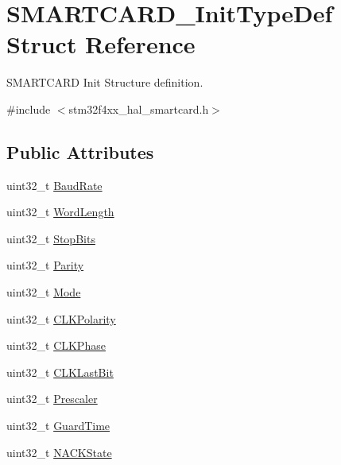 \hypertarget{struct_s_m_a_r_t_c_a_r_d___init_type_def}{}\section{S\+M\+A\+R\+T\+C\+A\+R\+D\+\_\+\+Init\+Type\+Def Struct Reference}
\label{struct_s_m_a_r_t_c_a_r_d___init_type_def}


S\+M\+A\+R\+T\+C\+A\+RD Init Structure definition.  




{\ttfamily \#include $<$stm32f4xx\+\_\+hal\+\_\+smartcard.\+h$>$}

\subsection*{Public Attributes}
\begin{DoxyCompactItemize}
\item 
uint32\+\_\+t \hyperlink{struct_s_m_a_r_t_c_a_r_d___init_type_def_ab7fd32cfbfc629344b4e4d5844e798cd}{Baud\+Rate}
\item 
uint32\+\_\+t \hyperlink{struct_s_m_a_r_t_c_a_r_d___init_type_def_a16a8ba82fbc742510824bb0d8e85fbbc}{Word\+Length}
\item 
uint32\+\_\+t \hyperlink{struct_s_m_a_r_t_c_a_r_d___init_type_def_ac0eb966bac71de17ace31fa5214c23f9}{Stop\+Bits}
\item 
uint32\+\_\+t \hyperlink{struct_s_m_a_r_t_c_a_r_d___init_type_def_aaefc9fdd7fd84b066ded393a3830743f}{Parity}
\item 
uint32\+\_\+t \hyperlink{struct_s_m_a_r_t_c_a_r_d___init_type_def_acf1faf22e7003550470b97b9f77425f9}{Mode}
\item 
uint32\+\_\+t \hyperlink{struct_s_m_a_r_t_c_a_r_d___init_type_def_abb3ca75bd370b08fcdf0d47c00741b0a}{C\+L\+K\+Polarity}
\item 
uint32\+\_\+t \hyperlink{struct_s_m_a_r_t_c_a_r_d___init_type_def_aea57d654156ac6b3eff7dae2bc4d6c5d}{C\+L\+K\+Phase}
\item 
uint32\+\_\+t \hyperlink{struct_s_m_a_r_t_c_a_r_d___init_type_def_a484c956dcdfc4e604758698b3541c128}{C\+L\+K\+Last\+Bit}
\item 
uint32\+\_\+t \hyperlink{struct_s_m_a_r_t_c_a_r_d___init_type_def_a7ff96c14ecfbe219a2773a1a2cf897a4}{Prescaler}
\item 
uint32\+\_\+t \hyperlink{struct_s_m_a_r_t_c_a_r_d___init_type_def_a5bfb799c3c7ee1faed6b1eda12c79f1a}{Guard\+Time}
\item 
uint32\+\_\+t \hyperlink{struct_s_m_a_r_t_c_a_r_d___init_type_def_a3be795a888d187da69f8dcdfab38da74}{N\+A\+C\+K\+State}
\end{DoxyCompactItemize}


